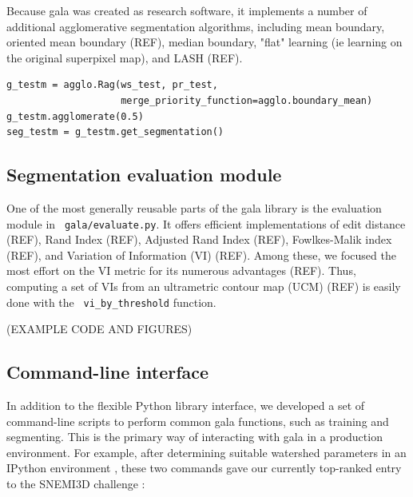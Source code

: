 \documentclass{frontiersSCNS} %
\begin{document}
Because gala was created as research software, it implements a number of additional agglomerative segmentation algorithms, including mean boundary, oriented mean boundary (REF), median boundary, "flat" learning (ie learning on the original superpixel map), and LASH (REF).

{\small
\begin{verbatim}
g_testm = agglo.Rag(ws_test, pr_test,
                    merge_priority_function=agglo.boundary_mean)
g_testm.agglomerate(0.5)
seg_testm = g_testm.get_segmentation()
\end{verbatim}
}

\subsection{Segmentation evaluation module}

One of the most generally reusable parts of the gala library is the evaluation module in \texttt{ \small gala/evaluate.py}.
It offers efficient implementations of edit distance (REF), Rand Index (REF), Adjusted Rand Index (REF), Fowlkes-Malik index (REF), and Variation of Information (VI) (REF).
Among these, we focused the most effort on the VI metric for its numerous advantages (REF).
Thus, computing a set of VIs from an ultrametric contour map (UCM) (REF) is easily done with the \texttt{ \small vi\_by\_threshold} function.

(EXAMPLE CODE AND FIGURES)

\subsection{Command-line interface}

In addition to the flexible Python library interface, we developed a set of command-line scripts to perform common gala functions, such as training and segmenting.
This is the primary way of interacting with gala in a production environment.
For example, after determining suitable watershed parameters in an IPython environment \citep{Perez:2007}, these two commands gave our currently top-ranked entry to the SNEMI3D challenge \citep{snemi}:
\end{document}
